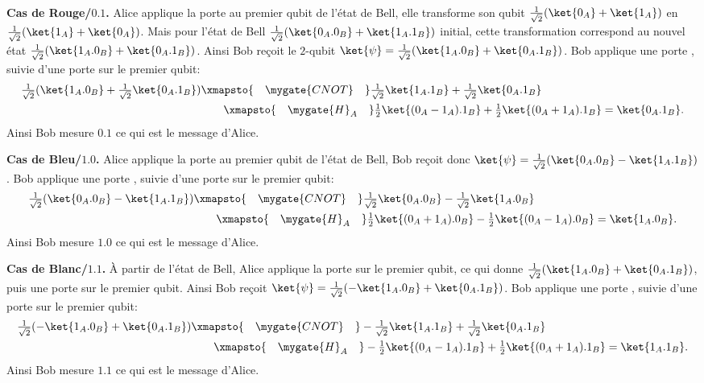 \documentclass[11pt,class=report,crop=false]{standalone}
\begin{document}
\bigskip
\textbf{Cas de \og{}Rouge/$0.1$\fg{}.}
Alice applique la porte  au premier qubit de l'état de Bell,
elle transforme son qubit $\tfrac{1}{\sqrt2}(\ket{0_A} + \ket{1_A})$ en $\tfrac{1}{\sqrt2}(\ket{1_A} + \ket{0_A})$.
Mais pour l'état de Bell $\tfrac{1}{\sqrt2}(\ket{0_A.0_B} + \ket{1_A.1_B})$ initial, cette transformation
correspond au nouvel état $\tfrac{1}{\sqrt2}(\ket{1_A.0_B} + \ket{0_A.1_B})$.
Ainsi Bob reçoit le $2$-qubit $\ket{\psi} = \tfrac{1}{\sqrt2}(\ket{1_A.0_B} + \ket{0_A.1_B})$.
Bob applique une porte  , suivie d'une porte  sur le premier qubit:
\begin{align*}
\tfrac{1}{\sqrt2}(\ket{1_A.0_B} + \tfrac{1}{\sqrt2}\ket{0_A.1_B}) 
&\xmapsto{\quad\mygate{CNOT}\quad}  \tfrac{1}{\sqrt2}\ket{1_A.1_B}+\tfrac{1}{\sqrt2}\ket{0_A.1_B}\\
&\qquad\xmapsto{\quad\mygate{H}_A\quad} \tfrac{1}{2}\ket{(0_A-1_A).1_B} + \tfrac{1}{2}\ket{(0_A+1_A).1_B}
= \ket{0_A.1_B}.
\end{align*}
Ainsi Bob mesure $0.1$ ce qui est le message d'Alice.

\bigskip
\textbf{Cas de \og{}Bleu/$1.0$\fg{}.}
Alice applique la porte  au premier qubit de l'état de Bell,
Bob reçoit donc $\ket{\psi} = \tfrac{1}{\sqrt2}(\ket{0_A.0_B} - \ket{1_A.1_B})$.
Bob applique une porte  , suivie d'une porte  sur le premier qubit:
\begin{align*}
\tfrac{1}{\sqrt2}(\ket{0_A.0_B} - \ket{1_A.1_B}) 
&\xmapsto{\quad\mygate{CNOT}\quad}  \tfrac{1}{\sqrt2}\ket{0_A.0_B} - \tfrac{1}{\sqrt2}\ket{1_A.0_B}\\
&\qquad\xmapsto{\quad\mygate{H}_A\quad} \tfrac{1}{2}\ket{(0_A+1_A).0_B} - \tfrac{1}{2}\ket{(0_A-1_A).0_B}
= \ket{1_A.0_B}.
\end{align*}
Ainsi Bob mesure $1.0$ ce qui est le message d'Alice.


\bigskip
\textbf{Cas de \og{}Blanc/$1.1$\fg{}.}
À partir de l'état de Bell, 
Alice applique la porte  sur le premier qubit, ce qui donne
$\tfrac{1}{\sqrt2}(\ket{1_A.0_B} + \ket{0_A.1_B})$, puis une porte  sur le premier qubit.
 Ainsi Bob reçoit $\ket{\psi} = \tfrac{1}{\sqrt2}(-\ket{1_A.0_B} + \ket{0_A.1_B})$.
Bob applique une porte  , suivie d'une porte  sur le premier qubit:
\begin{align*}
\tfrac{1}{\sqrt2}(-\ket{1_A.0_B} + \ket{0_A.1_B})
&\xmapsto{\quad\mygate{CNOT}\quad}  -\tfrac{1}{\sqrt2}\ket{1_A.1_B}+\tfrac{1}{\sqrt2}\ket{0_A.1_B}\\
&\qquad\xmapsto{\quad\mygate{H}_A\quad} -\tfrac{1}{2}\ket{(0_A-1_A).1_B} + \tfrac{1}{2}\ket{(0_A+1_A).1_B}
= \ket{1_A.1_B}.
\end{align*}
Ainsi Bob mesure $1.1$ ce qui est le message d'Alice.
\end{document}

